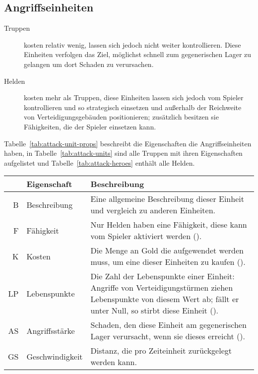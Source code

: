 \subsection{Angriffseinheiten}

\begin{description}
  \item[Truppen]
    kosten relativ wenig, lassen sich jedoch nicht weiter kontrollieren. Diese
    Einheiten verfolgen das Ziel, möglichst schnell zum gegenerischen Lager zu
    gelangen um dort Schaden zu verursachen.

  \item[Helden] kosten mehr als Truppen, diese Einheiten lassen sich jedoch vom
    Spieler kontrollieren und so strategisch einsetzen und außerhalb der
    Reichweite von Verteidigungsgebäuden positionieren; zusätzlich besitzen sie
    Fähigkeiten, die der Spieler einsetzen kann.

\end{description}

Tabelle~\ref{tab:attack-unit-props} beschreibt die Eigenschaften die
Angriffseinheiten haben, in Tabelle~\ref{tab:attack-units} sind alle Truppen
mit ihren Eigenschaften aufgelistet und Tabelle~\ref{tab:attack-heroes} enthält
alle Helden.

\begin{table}[htbp]
  \caption{Eigenschaften von Angriffseinheiten}
  \label{tab:attack-unit-props}
  \small
  \begin{longtabu}{rlX}
    \toprule\rowfont{\itshape}
    & Eigenschaft & Beschreibung \\
    \midrule

    B  & Beschreibung
       & Eine allgemeine Beschreibung dieser Einheit und vergleich zu anderen
         Einheiten. \\
    F  & Fähigkeit
       & Nur Helden haben eine Fähigkeit, diese kann vom Spieler aktiviert
         werden (). \\
    K  & Kosten
       & Die Menge an Gold die aufgewendet werden muss, um eine dieser
         Einheiten zu kaufen (). \\
    LP & Lebenspunkte
       & Die Zahl der Lebenspunkte einer Einheit: Angriffe von
         Verteidigungstürmen ziehen Lebenspunkte von diesem Wert ab; fällt er
         unter Null, so stirbt diese Einheit (). \\
    AS & Angriffsstärke
       & Schaden, den diese Einheit am gegenerischen Lager verursacht, wenn sie
         dieses erreicht (). \\
    GS & Geschwindigkeit & Distanz, die pro Zeiteinheit zurückgelegt werden
         kann. \\

    \bottomrule
  \end{longtabu}
\end{table}

